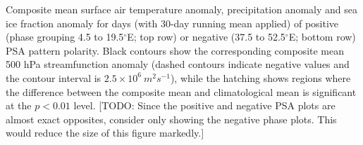 \label{fig:surface_composites}
Composite mean surface air temperature anomaly, precipitation anomaly and sea ice fraction anomaly for days (with 30-day running mean applied) of positive (phase grouping 4.5 to 19.5$^{\circ}$E; top row) or negative (37.5 to 52.5$^{\circ}$E; bottom row) PSA pattern polarity. Black contours show the corresponding composite mean 500 hPa streamfunction anomaly (dashed contours indicate negative values and the contour interval is $2.5 \times 10^6 \: m^2 s^{-1}$), while the hatching shows regions where the difference between the composite mean and climatological mean is significant at the $p < 0.01$ level. [TODO: Since the positive and negative PSA plots are almost exact opposites, consider only showing the negative phase plots. This would reduce the size of this figure markedly.]